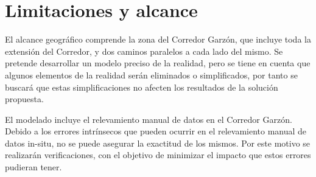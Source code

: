 %
%
%

\section{Limitaciones y alcance}

El alcance geográfico comprende la zona del Corredor Garzón, que incluye toda la extensión del Corredor, y dos caminos paralelos a cada lado del mismo. Se pretende desarrollar un modelo preciso de la realidad, pero se tiene en cuenta que algunos elementos de la realidad serán eliminados o simplificados, por tanto se buscará que estas simplificaciones no afecten los resultados de la solución propuesta. 

El modelado incluye el relevamiento manual de datos en el Corredor Garzón. Debido a los errores intrínsecos que pueden ocurrir en el relevamiento manual de datos in-situ, no se puede asegurar la exactitud de los mismos. Por este motivo se realizarán verificaciones, con el objetivo de minimizar el impacto que estos errores pudieran tener.





